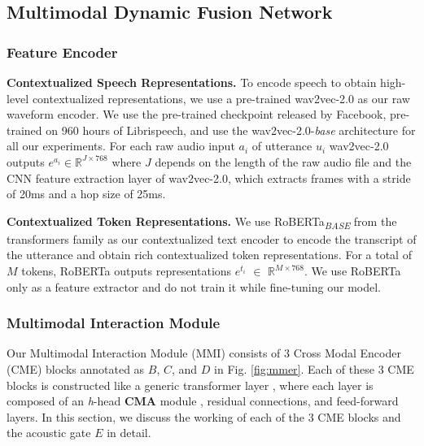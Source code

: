 \documentclass{INTERSPEECH2023}
\begin{document}
\subsection{Multimodal Dynamic Fusion Network}
\label{subsec:multimodal}

\subsubsection{Feature Encoder}

{\noindent \textbf{Contextualized Speech Representations.}} To encode speech to obtain high-level contextualized representations, we use a pre-trained wav2vec-2.0 \cite{baevski2020wav2vec} as our raw waveform encoder. We use the pre-trained checkpoint released by Facebook, pre-trained on 960 hours of Librispeech, and use the wav2vec-2.0-\emph{base} architecture for all our experiments. For each raw audio input $a_i$ of utterance $u_i$ wav2vec-2.0 outputs $e^{a_{i}} \in \mathbb{R}^{J\times768}$ where $J$ depends on the length of the raw audio file and the CNN feature extraction layer of wav2vec-2.0, which extracts frames with a stride of 20ms and a hop size of 25ms.
\vspace{0.5mm}




{\noindent \textbf{Contextualized Token Representations.}} We use RoBERTa\textsubscript{\emph{BASE}} from the transformers family as our contextualized text encoder to encode the transcript of the utterance and obtain rich contextualized token representations. For a total of $M$ tokens, RoBERTa outputs representations $e^{t_{i}}$ $\in$ $\mathbb{R}^{M\times768}$. We use RoBERTa only as a feature extractor and do not train it while fine-tuning our model.






\subsubsection{Multimodal Interaction Module}
Our Multimodal Interaction Module (MMI) consists of 3 Cross Modal Encoder (CME) blocks annotated as $B$, $C$, and $D$ in Fig. \ref{fig:mmer}. Each of these 3 CME blocks is constructed like a generic transformer layer \cite{vaswani2017attention}, where each layer is composed of an \emph{h}-head $\mathbf{CMA}$ module \cite{tsai2019multimodal}, residual connections, and feed-forward layers. In this section, we discuss the working of each of the 3 CME blocks and the acoustic gate $E$ in detail.
\vspace{1mm}
\end{document}
